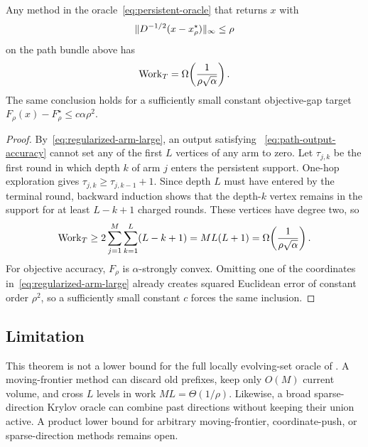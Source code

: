 \begin{theorem}
\label{thm:persistent-lower-bound}
Any method in the oracle~\eqref{eq:persistent-oracle} that returns $x$ with
\begin{equation}
 \lVert D^{-1/2}(x-x_\rho^\star)\rVert_\infty\le\rho
 \label{eq:path-output-accuracy}
\end{equation}
on the path bundle above has
\begin{equation}
 \operatorname{Work}_T=\Omega\!\left(\frac1{\rho\sqrt\alpha}\right).
 \label{eq:persistent-product-lb}
\end{equation}
The same conclusion holds for a sufficiently small constant objective-gap
target $F_\rho(x)-F_\rho^\star\le c\alpha\rho^2$.
\end{theorem}

\begin{proof}
By~\eqref{eq:regularized-arm-large}, an output satisfying
~\eqref{eq:path-output-accuracy} cannot set any of the first $L$ vertices of
any arm to zero.  Let $\tau_{j,k}$ be the first round in which depth $k$ of arm
$j$ enters the persistent support.  One-hop exploration gives
$\tau_{j,k}\ge\tau_{j,k-1}+1$.  Since depth $L$ must have entered by the
terminal round, backward induction shows that the depth-$k$ vertex remains in
the support for at least $L-k+1$ charged rounds.  These vertices have degree
two, so
\[
 \operatorname{Work}_T
 \ge2\sum_{j=1}^M\sum_{k=1}^L(L-k+1)
 =M L(L+1)
 =\Omega\!\left(\frac1{\rho\sqrt\alpha}\right).
\]
For objective accuracy, $F_\rho$ is $\alpha$-strongly convex.  Omitting one of
the coordinates in~\eqref{eq:regularized-arm-large} already creates squared
Euclidean error of constant order $\rho^2$, so a sufficiently small constant
$c$ forces the same inclusion.
\end{proof}

\subsection{Limitation}

This theorem is not a lower bound for the full locally evolving-set oracle of
\citet{zhou2024iterative}.  A moving-frontier method can discard old prefixes,
keep only $O(M)$ current volume, and cross $L$ levels in work $ML=\Theta(1/\rho)$.
Likewise, a broad sparse-direction Krylov oracle can combine past directions
without keeping their union active.  A product lower bound for arbitrary
moving-frontier, coordinate-push, or sparse-direction methods remains open.
